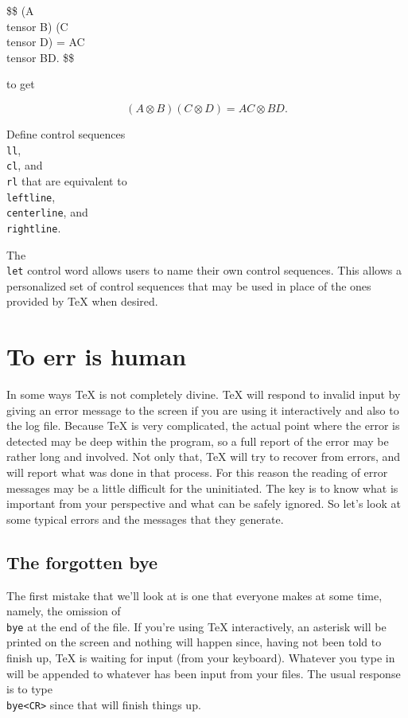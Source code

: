 
\let\tensor=\otimes 
\beginuser 
\$\$ (A \\tensor B) (C \\tensor D) = AC \\tensor BD. \$\$ 
\enduser 

\noindent to get 

$$ (A \tensor B) (C \tensor D) = AC \tensor BD. $$ 



\exercise Define control sequences {\tt \\ll}, {\tt \\cl}, and 
{\tt \\rl} that are equivalent to {\tt \\leftline}, {\tt \\centerline}, 
and {\tt \\rightline}. 

The {\tt \\let} control word allows users to name their own 
control sequences.  This allows a personalized set of control 
sequences that may be used in place of the ones provided by \TeX{} 
when desired. 

\section{To err is human} 

In some ways \TeX{} is not completely divine. \TeX{} will respond 
to invalid input by giving an error message to the screen if you 
are using it interactively and also to the log file.  Because 
\TeX{} is very complicated, the actual point where the error is 
detected may be deep within the program, so a full report of the 
error may be rather long and involved.    Not only that, \TeX{} 
will try to recover from errors, and will report what was done in 
that process.  For this reason the reading of error messages may 
be a little difficult for the uninitiated.  The key is to know 
what is important from your perspective and what can be safely 
ignored. So let's look at some typical errors and the messages 
that they generate. 

\subsection{The forgotten bye} 

The first mistake that we'll look at is one that everyone makes 
at some time, namely, the omission of {\tt \\bye} at the end of 
the file. If you're using \TeX{} interactively, an asterisk \hfil 
\break 
\leftline{\tt *} 
will be printed on the screen and nothing will happen since, 
having not been told to finish up,  \TeX{} is waiting for input 
(from your keyboard).  Whatever you type in will be appended to 
whatever has been input from your files.  The usual response is 
to type {\tt \\bye<CR>} since that will 
finish things up. 

